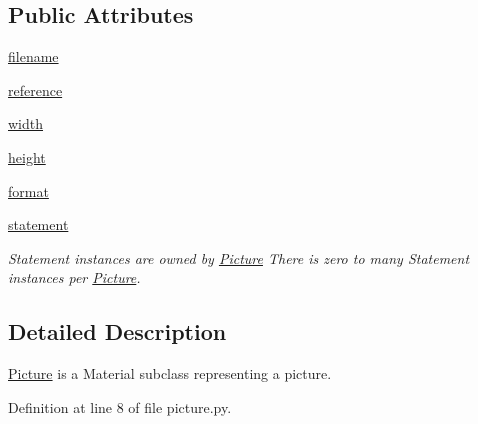 \subsection*{Public Attributes}
\begin{DoxyCompactItemize}
\item 
\hyperlink{classlmf_1_1src_1_1resources_1_1picture_1_1_picture_a669715ddfa35b08171c493ac8f0b4468}{filename}
\item 
\hyperlink{classlmf_1_1src_1_1resources_1_1picture_1_1_picture_a0363561d74da7f2fd08b13b8b27c36cb}{reference}
\item 
\hyperlink{classlmf_1_1src_1_1resources_1_1picture_1_1_picture_a1611f370dd4b978d9ed7a0352bc79156}{width}
\item 
\hyperlink{classlmf_1_1src_1_1resources_1_1picture_1_1_picture_aac1448966226ee0d40b4aa756c33f7f8}{height}
\item 
\hyperlink{classlmf_1_1src_1_1resources_1_1picture_1_1_picture_a47e1b58864e999a59dbeb80fdf779238}{format}
\item 
\hyperlink{classlmf_1_1src_1_1resources_1_1picture_1_1_picture_ac9b506362a054a04c2dfc776ba853762}{statement}
\begin{DoxyCompactList}\small\item\em Statement instances are owned by \hyperlink{classlmf_1_1src_1_1resources_1_1picture_1_1_picture}{Picture} There is zero to many Statement instances per \hyperlink{classlmf_1_1src_1_1resources_1_1picture_1_1_picture}{Picture}. \end{DoxyCompactList}\end{DoxyCompactItemize}


\subsection{Detailed Description}
\hyperlink{classlmf_1_1src_1_1resources_1_1picture_1_1_picture}{Picture} is a Material subclass representing a picture. 

Definition at line 8 of file picture.\+py.



